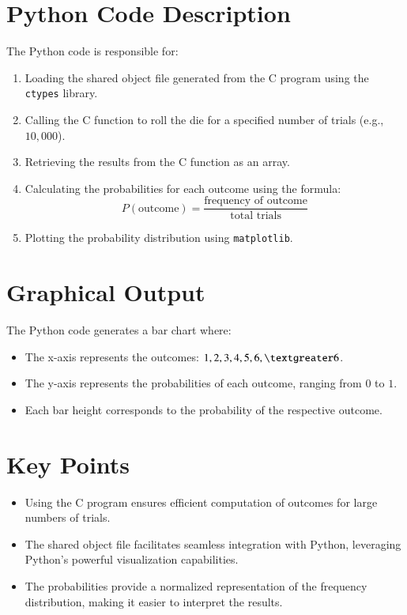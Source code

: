\documentclass[journal]{IEEEtran}
\begin{document}
\section*{Python Code Description}
The Python code is responsible for:
\begin{enumerate}
    \item Loading the shared object file generated from the C program using the \texttt{ctypes} library.
    \item Calling the C function to roll the die for a specified number of trials (e.g., \(10,000\)).
    \item Retrieving the results from the C function as an array.
    \item Calculating the probabilities for each outcome using the formula:
    \[
    P(\text{outcome}) = \frac{\text{frequency of outcome}}{\text{total trials}}
    \]
    \item Plotting the probability distribution using \texttt{matplotlib}.
\end{enumerate}

\section*{Graphical Output}
The Python code generates a bar chart where:
\begin{itemize}
    \item The x-axis represents the outcomes: \(1, 2, 3, 4, 5, 6, \textgreater6\).
    \item The y-axis represents the probabilities of each outcome, ranging from \(0\) to \(1\).
    \item Each bar height corresponds to the probability of the respective outcome.
\end{itemize}

\section*{Key Points}
\begin{itemize}
    \item Using the C program ensures efficient computation of outcomes for large numbers of trials.
    \item The shared object file facilitates seamless integration with Python, leveraging Python's powerful visualization capabilities.
    \item The probabilities provide a normalized representation of the frequency distribution, making it easier to interpret the results.
\end{itemize}
\end{document}
